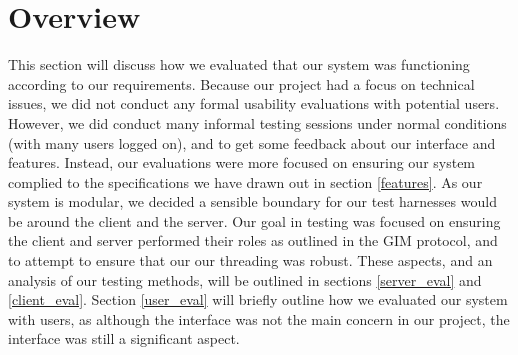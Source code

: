 \section{Overview}

This section will discuss how we evaluated that our system was functioning according to our requirements. Because our project had a focus on technical issues, we did not conduct any formal usability evaluations with potential users. However, we did conduct many informal testing sessions under normal conditions (with many users logged on), and to get some feedback about our interface and features. Instead, our evaluations were more focused on ensuring our system complied to the specifications we have drawn out in section \ref{features}. As our system is modular, we decided a sensible boundary for our test harnesses would be around the client and the server. Our goal in testing was focused on ensuring the client and server performed their roles as outlined in the GIM protocol, and to attempt to ensure that our our threading was robust.  These aspects, and an analysis of our testing methods, will be outlined in sections \ref{server_eval} and \ref{client_eval}. Section \ref{user_eval} will briefly outline how we evaluated our system with users, as although the interface was not the main concern in our project, the interface was still a significant aspect.

